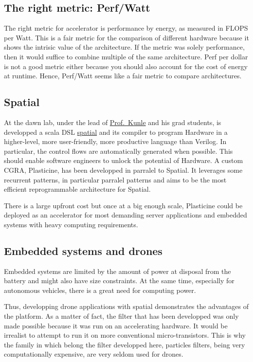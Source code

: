 \documentclass[12pt,]{article}
\begin{document}
\subsection{The right metric:
Perf/Watt}\label{the-right-metric-perfwatt}

The right metric for accelerator is performance by energy, as measured
in FLOPS per Watt. This is a fair metric for the comparison of different
hardware because it shows the intrisic value of the architecture. If the
metric was solely performance, then it would suffice to combine multiple
of the same architecture. Perf per dollar is not a good metric either
because you should also account for the cost of energy at runtime.
Hence, Perf/Watt seems like a fair metric to compare architectures.

\subsection{Spatial}\label{spatial}

At the dawn lab, under the lead of
\href{http://arsenalfc.stanford.edu/kunle}{Prof.~Kunle} and his grad
students, is developped a scala DSL
\href{https://github.com/stanford-ppl/spatial-lang}{spatial} and its
compiler to program Hardware in a higher-level, more user-friendly, more
productive language than Verilog. In particular, the control flows are
automatically generated when possible. This should enable software
engineers to unlock the potential of Hardware. A custom CGRA,
Plasticine, has been developped in parralel to Spatial. It leverages
some recurrent patterns, in particular parralel patterns and aims to be
the most efficient reprogrammable architecture for Spatial.

There is a large upfront cost but once at a big enough scale, Plasticine
could be deployed as an accelerator for most demanding server
applications and embedded systems with heavy computing requirements.

\subsection{Embedded systems and
drones}\label{embedded-systems-and-drones}

Embedded systems are limited by the amount of power at disposal from the
battery and might also have size constraints. At the same time,
especially for autonomous vehicles, there is a great need for computing
power.

Thus, developping drone applications with spatial demonstrates the
advantages of the platform. As a matter of fact, the filter that has
been developped was only made possible because it was run on an
accelerating hardware. It would be irrealist to attempt to run it on
more conventional micro-transistors. This is why the family in which
belong the filter developped here, particles filters, being very
computationally expensive, are very seldom used for drones.
\end{document}

